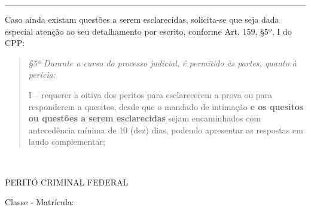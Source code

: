 \bigskip
\begin{center}
	\noindent\rule{\linewidth/4}{0.4pt}
\end{center}
\bigskip

Caso ainda existam questões a serem esclarecidas, solicita-se que seja dada especial atenção ao seu detalhamento por escrito, conforme Art. 159, \S 5º, I do CPP:

\begin{quotation}
	\itshape
	\S 5º  Durante o curso do processo judicial, é permitido às partes, quanto à perícia:
	
	I – requerer a oitiva dos peritos para esclarecerem a prova ou para responderem a quesitos, desde que o mandado de intimação \textbf{e os quesitos ou questões a serem esclarecidas} sejam encaminhados com antecedência mínima de 10 (dez) dias, podendo apresentar as respostas em laudo complementar;
\end{quotation}


\begin{center}
	~\bigskip

	\textbf{\MakeUppercase{\pfauthor}}
	
	PERITO CRIMINAL FEDERAL
	
	Classe \pfauthorclass\space - Matrícula: \pfauthormatr

	
\end{center}
